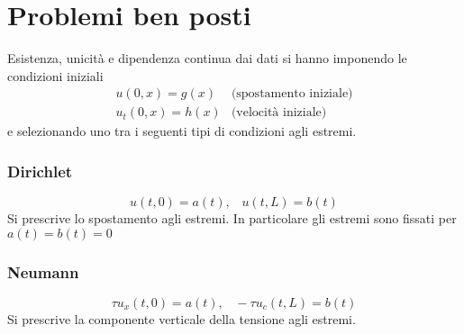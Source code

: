 \section{Problemi ben posti}
Esistenza, unicit\`a e dipendenza continua dai dati si hanno imponendo le
condizioni iniziali
\[
\begin{array}{ll}
	u(0,x)=g(x) & \text{(spostamento iniziale)}\\
	u_t(0,x)=h(x) & \text{(velocit\`a iniziale)}
\end{array}
\]
e selezionando uno tra i seguenti tipi di condizioni agli estremi.
\subsubsection{Dirichlet}
\[
	u(t,0)=a(t), \;\;\; u(t,L)=b(t)
\]
Si prescrive lo spostamento agli estremi.
In particolare gli estremi sono fissati per $a(t)= b(t)=0$
\subsubsection{Neumann}
\[
	\tau u_x(t,0)=a(t), \;\;\; -\tau u_c (t,L)=b(t)
\]
Si prescrive la componente verticale della tensione agli estremi.
